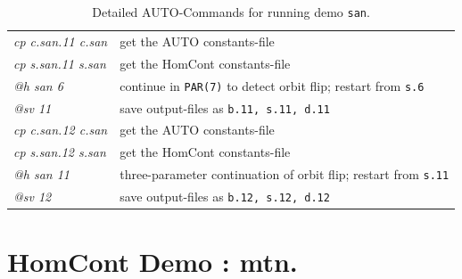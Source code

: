 \documentclass[12pt]{report}
\begin{document}
\begin{table}[htbp]
\begin{center}
\begin{tabular}{| l | l |}
\hline
  {\it cp c.san.11 c.san} & get the AUTO constants-file \\ 
  {\it cp s.san.11 s.san} & get the HomCont constants-file \\ 
  {\it @h san 6} & continue in {\tt PAR(7)} to detect orbit flip; restart from {\tt s.6} \\ 
  {\it @sv 11} & save output-files as {\tt b.11, s.11, d.11} \\ 
\hline
  {\it cp c.san.12 c.san} & get the AUTO constants-file \\ 
  {\it cp s.san.12 s.san} & get the HomCont constants-file \\ 
  {\it @h san 11} & three-parameter continuation of orbit flip; restart from {\tt s.11} \\ 
  {\it @sv 12} & save output-files as {\tt b.12, s.12, d.12} \\ 
\hline
\end{tabular}
\caption{Detailed {\cal AUTO}-Commands for running demo {\tt san}.}
\label{tbl:demo_san_2}
\end{center}
\end{table}




\chapter{ {\cal HomCont} Demo : mtn.} \label{ch:HomCont_mtn}

\end{document}
